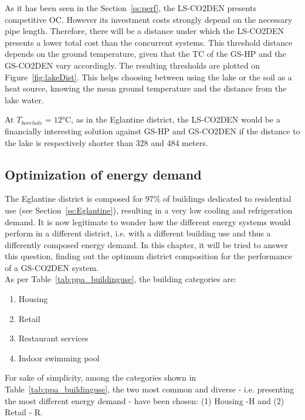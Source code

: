\documentclass{article}
\begin{document}
As it has been seen in the Section~\ref{ss:perf}, the LS-CO2DEN presents competitive OC. However its investment costs strongly depend on the necessary pipe length. Therefore, there will be a distance under which the LS-CO2DEN presents a lower total cost than the concurrent systems. This threshold distance depends on the ground temperature, given that the TC of the GS-HP and the GS-CO2DEN vary accordingly. The resulting thresholds are plotted on Figure~\ref{fig:lakeDist}. This helps choosing between using the lake or the soil as a heat source, knowing the mean ground temperature and the distance from the lake water.


At $T_{borehole} = 12 \si{\celsius}$, as in the Eglantine district, the LS-CO2DEN would be a financially interesting solution against  GS-HP and GS-CO2DEN if the distance to the lake is respectively shorter than 328 and 484 meters.


\subsection{Optimization of energy demand}

The Eglantine district is composed for 97\% of buildings dedicated to residential use (see Section~\ref{ss:Eglantine}), resulting in a very low cooling and refrigeration demand. It is now legitimate to wonder how the different energy systems would perform in a different district, i.e. with a different building use and thus a differently composed energy demand. In this chapter, it will be tried to answer this question, finding out the optimum district composition for the performance of a GS-CO2DEN system.\\

As per Table~\ref{tab:ppa_buildinguse}, the building categories are:
\begin{enumerate}
	\item Housing
	\item Retail
	\item Restaurant services
	\item Indoor swimming pool
\end{enumerate}
For sake of simplicity, among the categories shown in Table~\ref{tab:ppa_buildinguse}, the two most common and diverse - i.e. presenting the most different energy demand - have been chosen: (1) Housing -H and (2) Retail - R. \\
\end{document}
